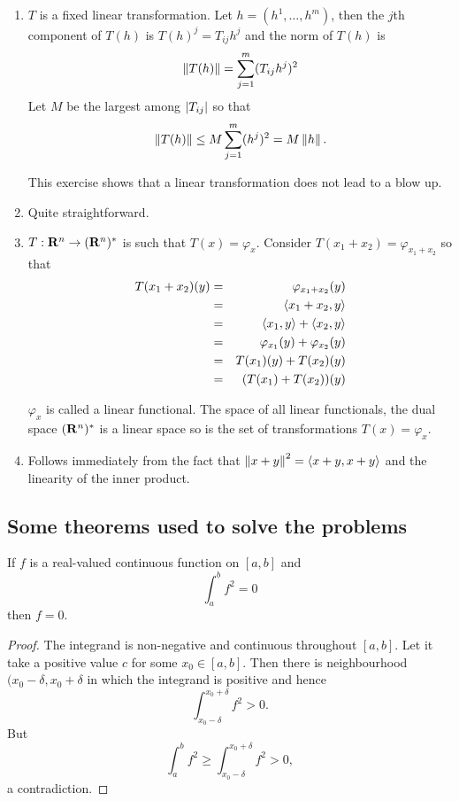\begin{enumerate}
\item $T$ is a fixed linear transformation. Let $h = (h^1, \ldots, h^m)$,
then the $j$th component of $T(h)$ is $T(h)^j = T_{ij}h^j$ and the norm of
$T(h)$ is
\[
\left\Vert{T(h)}\right\Vert = \sum_{j=1}^m (T_{ij}h^j)^2
\]
Let $M$ be the largest among $\left\vert{T_{ij}}\right\vert$ so that
\[
\left\Vert{T(h)}\right\Vert \le M \sum_{j=1}^m (h^j)^2 = M\left\Vert{h}\right\Vert.
\]
\begin{rem} This exercise shows that a linear transformation does not lead to
a blow up.
\end{rem}

\item Quite straightforward.

\item $T : \mathbf{R}^n \rightarrow (\mathbf{R}^n)^\ast$ is such that $T(x) = \varphi_x$.
Consider $T(x_1 + x_2) = \varphi_{x_1 + x_2}$ so that
\begin{eqnarray*}
T(x_1 + x_2)(y) &=& \varphi_{x_1+x_2}(y) \\
 &=& \left\langle{x_1+x_2, y}\right\rangle \\
 &=& \left\langle{x_1, y}\right\rangle + \left\langle{x_2, y}\right\rangle \\
 &=& \varphi_{x_1}(y) + \varphi_{x_2}(y) \\
 &=& T(x_1)(y) + T(x_2)(y) \\
 &=& (T(x_1) + T(x_2))(y)
\end{eqnarray*}
\begin{rem}
$\varphi_x$ is called a linear functional. The space of all linear functionals,
the dual space $(\mathbf{R}^n)^\ast$ is a linear space so is the set of 
transformations $T(x) = \varphi_x$.
\end{rem}

\item Follows immediately from the fact that $\left\Vert{x+y}\right\Vert^2 = \left\langle{x+y, x+y}\right\rangle$ 
and the linearity of the inner product.
\end{enumerate}

\subsection{Some theorems used to solve the problems}
\begin{thm}\label{c1s1t2}
If $f$ is a real-valued continuous function on $[a, b]$ and 
\[
\int_a^b f^2 = 0
\]
then $f = 0$.
\end{thm}
\begin{proof}
The integrand is non-negative and continuous throughout $[a, b]$. Let it take 
a positive value $c$ for some $x_0 \in [a, b]$. Then there is neighbourhood
$(x_0 - \delta, x_0 + \delta$ in which the integrand is positive and hence
\[
\int_{x_0 - \delta}^{x_0 + \delta} f^2 > 0.
\]
But
\[
\int_a^b f^2 \ge \int_{x_0 - \delta}^{x_0 + \delta} f^2 > 0,
\]
a contradiction. 
\end{proof}

